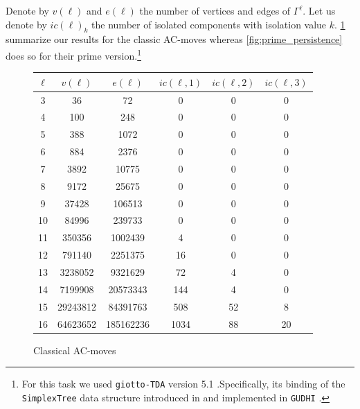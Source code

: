 Denote by $v(\ell)$ and $e(\ell)$ the number of vertices and edges of $\Gamma^\ell$.
Let us denote by $ic(\ell)_k$ the number of isolated components with isolation value $k$.
\cref{fig:classical_persistence} summarize our results for the classic AC-moves whereas \cref{fig:prime_persistence} does so for their prime version.\footnote{
	For this task we used \texttt{giotto-TDA} version 5.1 \cite{tauzin2021giotto}.Specifically, its binding of the \texttt{SimplexTree} data structure introduced in \cite{boissonnat2014simplex} and implemented in \texttt{GUDHI} \cite{maria2014gudhi}.}

\begin{figure}
	\begin{tabular}{|c|c|c|c|c|c|}
		\hline
		$\ell$ & $v(\ell)$ & $e(\ell)$ & $ic(\ell,1)$ & $ic(\ell,2)$ & $ic(\ell,3)$ \\ \hline
		3 & 36 & 72 & 0 & 0 & 0 \\ \hline
		4 & 100 & 248 & 0 & 0 & 0 \\ \hline
		5 & 388 & 1072 & 0 & 0 & 0 \\ \hline
		6 & 884 & 2376 & 0 & 0 & 0 \\ \hline
		7 & 3892 & 10775 & 0 & 0 & 0 \\ \hline
		8 & 9172 & 25675 & 0 & 0 & 0 \\ \hline
		9 & 37428 & 106513 & 0 & 0 & 0 \\ \hline
		10 & 84996 & 239733 & 0 & 0 & 0 \\ \hline
		11 & 350356 & 1002439 & 4 & 0 & 0 \\ \hline
		12 & 791140 & 2251375 & 16 & 0 & 0 \\ \hline
		13 & 3238052 & 9321629 & 72 & 4 & 0 \\ \hline
		14 & 7199908 & 20573343 & 144 & 4 & 0 \\ \hline
		15 & 29243812 & 84391763 & 508 & 52 & 8 \\ \hline
		16 & 64623652 & 185162236 & 1034 & 88 & 20 \\ \hline
	\end{tabular}
	\caption{Classical AC-moves}
	\label{fig:classical_persistence}
\end{figure}

